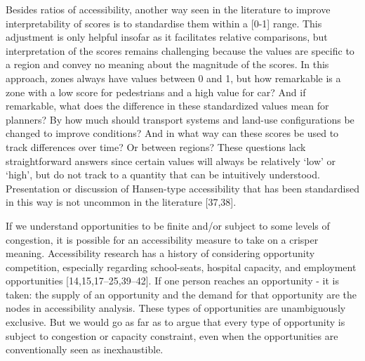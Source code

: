 \documentclass[10pt,letterpaper]{article}
\begin{document}
Besides ratios of accessibility, another way seen in the literature to
improve interpretability of scores is to standardise them within a
{[}0-1{]} range. This adjustment is only helpful insofar as it
facilitates relative comparisons, but interpretation of the scores
remains challenging because the values are specific to a region and
convey no meaning about the magnitude of the scores. In this approach,
zones always have values between 0 and 1, but how remarkable is a zone
with a low score for pedestrians and a high value for car? And if
remarkable, what does the difference in these standardized values mean
for planners? By how much should transport systems and land-use
configurations be changed to improve conditions? And in what way can
these scores be used to track differences over time? Or between regions?
These questions lack straightforward answers since certain values will
always be relatively `low' or `high', but do not track to a quantity
that can be intuitively understood. Presentation or discussion of
Hansen-type accessibility that has been standardised in this way is not
uncommon in the literature {[}37,38{]}.

If we understand opportunities to be finite and/or subject to some
levels of congestion, it is possible for an accessibility measure to
take on a crisper meaning. Accessibility research has a history of
considering opportunity competition, especially regarding school-seats,
hospital capacity, and employment opportunities
{[}14,15,17--25,39--42{]}. If one person reaches an opportunity - it is
taken: the supply of an opportunity and the demand for that opportunity
are the nodes in accessibility analysis. These types of opportunities
are unambiguously exclusive. But we would go as far as to argue that
every type of opportunity is subject to congestion or capacity
constraint, even when the opportunities are conventionally seen as
inexhaustible.
\end{document}
